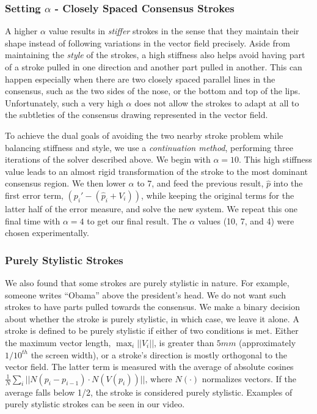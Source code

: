 \subsubsection{Setting $\alpha$ - Closely Spaced Consensus Strokes}

A higher $\alpha$ value results in {\em stiffer} strokes in the sense that they maintain their shape instead of following variations in the vector field precisely. Aside from maintaining the {\em style} of the strokes, a high stiffness also helps avoid having part of a stroke pulled in one direction and another part pulled in another. This can happen especially when there are two closely spaced parallel lines in the consensus, such as the two sides of the nose, or the bottom and top of the lips. Unfortunately, such a very high $\alpha$ does not allow the strokes to adapt at all to the subtleties of the consensus drawing represented in the vector field.

To achieve the dual goals of avoiding the two nearby stroke problem while balancing stiffness and style, we use a {\em continuation method}, performing three iterations of the solver described above. We begin with $\alpha=10$. This high stiffness value leads to an almost rigid transformation of the stroke to the most dominant consensus region. We then lower $\alpha$ to 7, and feed the previous result, $\hat{p}$ into the first error term, $(p_i' - (\hat{p}_i + V_i))$, while keeping the original terms for the latter half of the error measure, and solve the new system. We repeat this one final time with $\alpha=4$ to get our final result. The $\alpha$ values (10, 7, and 4) were chosen experimentally.

\subsubsection{Purely Stylistic Strokes}

We also found that some strokes are purely stylistic in nature. For example, someone writes ``Obama'' above the president's head. We do not want such strokes to have parts pulled towards the consensus. We make a binary decision about whether the stroke is purely stylistic, in which case, we leave it alone. A stroke is defined to be purely stylistic if either of two conditions is met. Either the maximum vector length, $\max_i||V_i||$, is greater than $5mm$ (approximately $1/10^{th}$ the screen width), or a stroke's direction is mostly orthogonal to the vector field. The latter term is measured with the average of absolute cosines $\frac{1}{N}\sum_i||N(p_i - p_{i-1}) \cdot N(V(p_i))||\textrm{,}$ where $N(\cdot)$ normalizes vectors. If the average falls below 1/2, the stroke is considered purely stylistic. Examples of purely stylistic strokes can be seen in our video.


